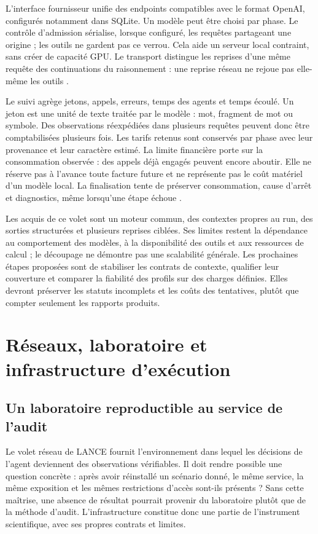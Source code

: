 \documentclass[11pt,a4paper]{article}
\begin{document}
L'interface fournisseur unifie des endpoints compatibles avec le format
OpenAI, configurés notamment dans SQLite. Un modèle peut être choisi par
phase. Le contrôle d'admission sérialise, lorsque configuré, les requêtes
partageant une origine ; les outils ne gardent pas ce verrou. Cela aide un
serveur local contraint, sans créer de capacité GPU. Le transport distingue
les reprises d'une même requête des continuations du raisonnement : une reprise
réseau ne rejoue pas elle-même les outils \cite{arch-provider,arch-transport,arch-admission}.

Le suivi agrège jetons, appels, erreurs, temps des agents et temps écoulé.
Un jeton est une unité de texte traitée par le modèle : mot, fragment de mot
ou symbole. Des observations réexpédiées dans plusieurs requêtes peuvent donc
être comptabilisées plusieurs fois.
Les tarifs retenus sont conservés par phase avec leur provenance et leur
caractère estimé. La limite financière porte sur la consommation observée :
des appels déjà engagés peuvent encore aboutir. Elle ne réserve pas à l'avance
toute facture future et ne représente pas le coût matériel d'un modèle local.
La finalisation tente de préserver consommation, cause d'arrêt et diagnostics,
même lorsqu'une étape échoue \cite{arch-cout,arch-pipeline}.

Les acquis de ce volet sont un moteur commun, des contextes propres au run,
des sorties structurées et plusieurs reprises ciblées. Ses limites restent
la dépendance au comportement des modèles, à la disponibilité des outils et
aux ressources de calcul ; le découpage ne démontre pas une scalabilité
générale. Les prochaines étapes proposées sont de stabiliser les contrats
de contexte, qualifier leur couverture et comparer la fiabilité des profils
sur des charges définies. Elles devront préserver les statuts incomplets
et les coûts des tentatives, plutôt que compter seulement les rapports produits.


\section{Réseaux, laboratoire et infrastructure d'exécution}
\label{sec:net-infrastructure}

\subsection{Un laboratoire reproductible au service de l'audit}

Le volet réseau de LANCE fournit l'environnement dans lequel les décisions de
l'agent deviennent des observations vérifiables. Il doit rendre possible une
question concrète : après avoir réinstallé un scénario donné, le même service,
la même exposition et les mêmes restrictions d'accès sont-ils présents ? Sans
cette maîtrise, une absence de résultat pourrait provenir du laboratoire plutôt
que de la méthode d'audit. L'infrastructure constitue donc une partie de
l'instrument scientifique, avec ses propres contrats et limites.
\end{document}
